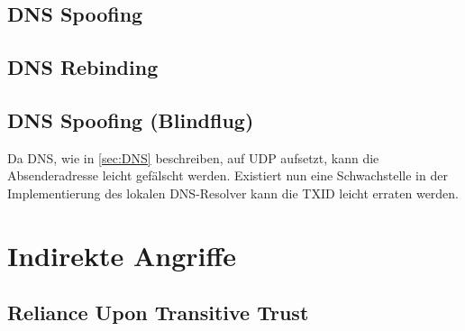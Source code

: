 
\begin{comment}
Wenn sniffing des Netzwerks möglich, dann DNS kein problem, da keinerlei Privicy. Auch bei DNSSEC ein Problem. DNSCrypt, DNSCurve, DNS-over-TLS, DNS-over-HTTPS lösen diese Probleme. Noch kein nativer support in vielen OS (atm nur experimentell in Andoid)
\end{comment}

\subsection{DNS Spoofing}



\begin{comment}
* DNS Spoofing/Faking ermöglicht MitM
* Speziell bei IOT da durch begrenzte Leistung oft keine Verschlüsselung. Bei HTTPS trotzdem Möglichkeiten durch Social-Engineering
\end{comment}

\subsection{DNS Rebinding}

\begin{comment}
Durch DoS von Resolvern oder DNS-Servern können kritischen Unternehmensdienste kurzfristig außer Betrieb genommen werden. Da die Verbindung zwischen diesen hoch vernetzten Diensten stark von DNS abhängt hat der Ausfall eines einzigen zentralen Dienstes (DynDns Vorfall) schwerwiegende Auswirkungen auf alle anhängenden Dienste.
\end{comment}

\subsection{DNS Spoofing (Blindflug)} %
Da DNS, wie in \ref{sec:DNS} beschreiben, auf UDP aufsetzt, kann die Absenderadresse leicht gefälscht werden. Existiert nun eine Schwachstelle in der Implementierung des lokalen DNS-Resolver kann die TXID leicht erraten werden. 

\section{Indirekte Angriffe}

\subsection{Reliance Upon Transitive Trust}

